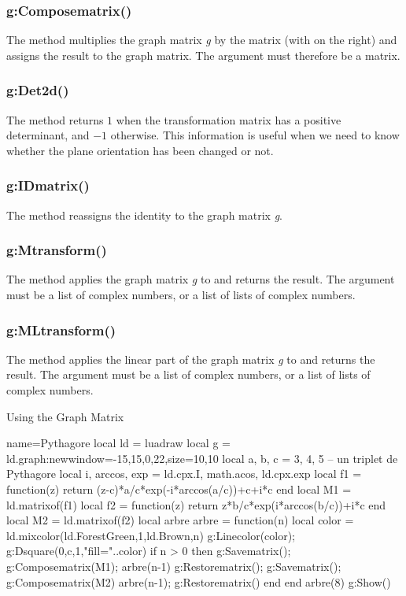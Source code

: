 \subsubsection{g:Composematrix()}
The  method multiplies the graph matrix \emph g by the matrix  (with  on the right) and assigns the result to the graph matrix. The argument  must therefore be a matrix.

\subsubsection{g:Det2d()}
The  method returns $1$ when the transformation matrix has a positive determinant, and $-1$ otherwise. This information is useful when we need to know whether the plane orientation has been changed or not.

\subsubsection{g:IDmatrix()}
The  method reassigns the identity to the graph matrix \emph g.

\subsubsection{g:Mtransform()}
The  method applies the graph matrix \emph g to  and returns the result. The argument  must be a list of complex numbers, or a list of lists of complex numbers.

\subsubsection{g:MLtransform()}
The  method applies the linear part of the graph matrix \emph g to  and returns the result. The argument  must be a list of complex numbers, or a list of lists of complex numbers.

\begin{demo}{Using the Graph Matrix}
\begin{luadraw}{name=Pythagore}
local ld = luadraw
local g = ld.graph:new{window={-15,15,0,22},size={10,10}}
local a, b, c = 3, 4, 5 -- un triplet de Pythagore
local i, arccos, exp = ld.cpx.I, math.acos, ld.cpx.exp
local f1 = function(z)
    return (z-c)*a/c*exp(-i*arccos(a/c))+c+i*c end
local M1 = ld.matrixof(f1)
local f2 = function(z)
    return z*b/c*exp(i*arccos(b/c))+i*c end
local M2 = ld.matrixof(f2)
local arbre
arbre = function(n)
    local color = ld.mixcolor(ld.ForestGreen,1,ld.Brown,n)
    g:Linecolor(color); g:Dsquare(0,c,1,"fill="..color)
    if n > 0 then
        g:Savematrix(); g:Composematrix(M1); arbre(n-1)
        g:Restorematrix(); g:Savematrix(); g:Composematrix(M2)
        arbre(n-1); g:Restorematrix()
    end
end
arbre(8)
g:Show()
\end{luadraw}
\end{demo}


